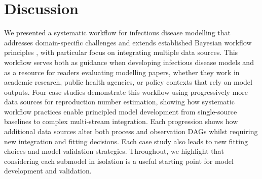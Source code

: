 \documentclass{article}
\begin{document}
\section{Discussion}


We presented a systematic workflow for infectious disease modelling that addresses domain-specific challenges and extends established Bayesian workflow principles \citep{gelman2020bayesian}, with particular focus on integrating multiple data sources.
This workflow serves both as guidance when developing infectious disease models and as a resource for readers evaluating modelling papers, whether they work in academic research, public health agencies, or policy contexts that rely on model outputs.
Four case studies demonstrate this workflow using progressively more data sources for reproduction number estimation, showing how systematic workflow practices enable principled model development from single-source baselines to complex multi-stream integration.
Each progression shows how additional data sources alter both process and observation DAGs whilst requiring new integration and fitting decisions.
Each case study also leads to new fitting choices and model validation strategies.
Throughout, we highlight that considering each submodel in isolation is a useful starting point for model development and validation.

\end{document}
